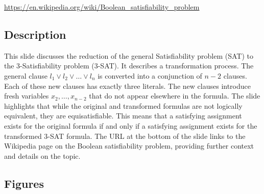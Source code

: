 \documentclass{article}%
\begin{document}
\url{https://en.wikipedia.org/wiki/Boolean_satisfiability_problem}
%
\subsection{Description}%
This slide discusses the reduction of the general Satisfiability problem (SAT) to the 3-Satisfiability problem (3-SAT).  It describes a transformation process.  The general clause $l_1 \vee l_2 \vee \dots \vee l_n$ is converted into a conjunction of $n-2$ clauses.  Each of these new clauses has exactly three literals.  The new clauses introduce fresh variables $x_2, \dots, x_{n-2}$ that do not appear elsewhere in the formula.  The slide highlights that while the original and transformed formulas are not logically equivalent, they are equisatisfiable.  This means that a satisfying assignment exists for the original formula if and only if a satisfying assignment exists for the transformed 3-SAT formula.  The URL at the bottom of the slide links to the Wikipedia page on the Boolean satisfiability problem, providing further context and details on the topic.%
\subsection{Figures}%
\begin{figure}[H]%
\centering%
\end{figure}

%
\newpage%
\end{document}
